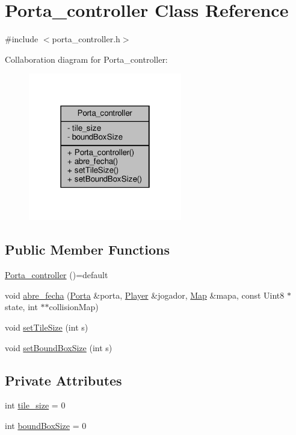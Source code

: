 \hypertarget{classPorta__controller}{}\section{Porta\+\_\+controller Class Reference}
\label{classPorta__controller}


{\ttfamily \#include $<$porta\+\_\+controller.\+h$>$}



Collaboration diagram for Porta\+\_\+controller\+:
\nopagebreak
\begin{figure}[H]
\begin{center}
\leavevmode
\includegraphics[width=190pt]{classPorta__controller__coll__graph}
\end{center}
\end{figure}
\subsection*{Public Member Functions}
\begin{DoxyCompactItemize}
\item 
\hyperlink{classPorta__controller_a89cf75aa5f2ce1658a8bb79ddd5d2f7a}{Porta\+\_\+controller} ()=default
\item 
void \hyperlink{classPorta__controller_a48b56002e2e7c95fccab3b46f4724c40}{abre\+\_\+fecha} (\hyperlink{classPorta}{Porta} \&porta, \hyperlink{classPlayer}{Player} \&jogador, \hyperlink{classMap}{Map} \&mapa, const Uint8 $\ast$state, int $\ast$$\ast$collision\+Map)
\item 
void \hyperlink{classPorta__controller_a372c8535da4c433e4d512a62c8169b57}{set\+Tile\+Size} (int s)
\item 
void \hyperlink{classPorta__controller_adbfa18c658caec1bd169e95a36de0d20}{set\+Bound\+Box\+Size} (int s)
\end{DoxyCompactItemize}
\subsection*{Private Attributes}
\begin{DoxyCompactItemize}
\item 
int \hyperlink{classPorta__controller_a5dd2267f5f11f53019a5418d1d4e9538}{tile\+\_\+size} = 0
\item 
int \hyperlink{classPorta__controller_a756d8d4a02fe24564c0c184f447f0933}{bound\+Box\+Size} = 0
\end{DoxyCompactItemize}



